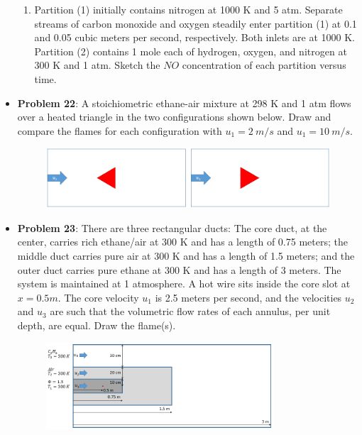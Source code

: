 \documentclass[11pt]{article}
\newcommand{\Item}[1]{\item \textbf{#1}:}
\newcommand{\Problem}[1]{\Item{Problem #1}}
\begin{document}
\begin{itemize}
\begin{enumerate}[label=\alph*)]
\item Partition (1) initially contains nitrogen at 1000 K and 5 atm. Separate streams of carbon monoxide and oxygen steadily enter partition (1) at 0.1 and 0.05 cubic meters per second, respectively. Both inlets are at 1000 K. Partition (2) contains 1 mole each of hydrogen, oxygen, and nitrogen at 300 K and 1 atm. Sketch the $NO$ concentration of each partition versus time.
\end{enumerate}
\newpage
\Problem{22} A stoichiometric ethane-air mixture at 298 K and 1 atm flows over a heated triangle in the two configurations shown below. Draw and compare the flames for each configuration with $u_1 = 2\ m/s$ and $u_1 = 10\ m/s$.
\begin{figure}[h]
\centering
\includegraphics[width=\textwidth]{Graphics/triangle_flows.PNG}
\end{figure}

\Problem{23} There are three rectangular ducts: The core duct, at the center, carries rich ethane/air at 300 K and has a length of 0.75 meters; the middle duct carries pure air at 300 K and has a length of 1.5 meters; and the outer duct carries pure ethane at 300 K and has a length of 3 meters. The system is maintained at 1 atmosphere. A hot wire sits inside the core slot at $x=0.5m$. The core velocity $u_1$ is 2.5 meters per second, and the velocities $u_2$ and $u_3$ are such that the volumetric flow rates of each annulus, per unit depth, are equal. Draw the flame(s).

\begin{figure}[h]\centering\includegraphics[width=0.8\textwidth]{Graphics/multi_slot_burner.PNG}\end{figure}


\end{itemize}
\end{document}
